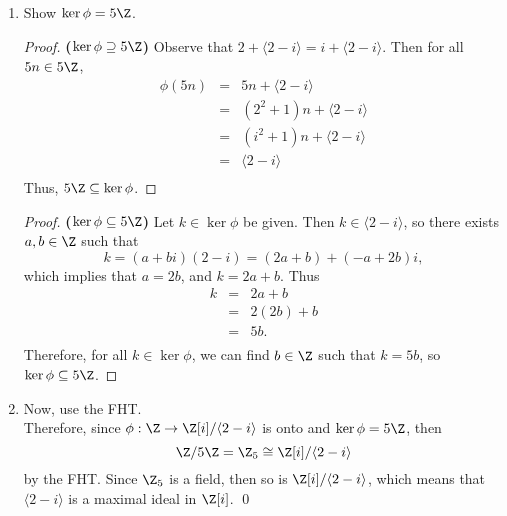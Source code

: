 \documentclass[letterpaper]{article}
\begin{document}
\begin{enumerate}
\begin{enumerate}[label=\alph*.]
  	\item Show $\ker\phi=5\Z$.
  	\begin{proof} \textbf{($\ker\phi\supseteq5\Z$)}
  	Observe that $2+\langle2-i\rangle=i+\langle2-i\rangle$. Then for all $5n\in5\Z$, %
  	\[\begin{array}{rcl}
  	\phi(5n)&=&5n+\langle2-i\rangle\\
  	&=&(2^2+1)n+\langle2-i\rangle\\
  	&=&(i^2+1)n+\langle2-i\rangle\\
  	&=&\langle2-i\rangle\\
  	\end{array}\]
  	Thus, $5\Z\subseteq\ker\phi$.
  	\end{proof}
  	\begin{proof}\textbf{($\ker\phi\subseteq5\Z$)} Let $k\in\ker\phi$ be given. Then $k\in\langle2-i\rangle$, so there exists $a,b\in\Z$ such that
  	$$k=(a+bi)(2-i)=(2a+b)+(-a+2b)i,$$
  	which implies that $a=2b$, and $k=2a+b$. Thus
  	\[\begin{array}{rcl}
  	k&=&2a+b\\
  	&=&2(2b)+b\\
  	&=&5b.\\
  	\end{array}\]
  	Therefore, for all $k\in\ker\phi$, we can find $b\in\Z$ such that $k=5b$, so $\ker\phi\subseteq5\Z$.
  	\end{proof}

  	\item Now, use the FHT. \\
  	Therefore, since $\phi:\Z\to\Z[i]/\langle2-i\rangle$ is onto and $\ker\phi=5\Z$, then
  	$$\Z/5\Z=\Z_5\cong\Z[i]/\langle2-i\rangle$$
  	by the FHT. Since $\Z_5$ is a field, then so is $\Z[i]/\langle2-i\rangle$, which means that $\langle2-i\rangle$ is a maximal ideal in $\Z[i]$. \qed
  	\end{enumerate}


\end{enumerate}
\end{document}

